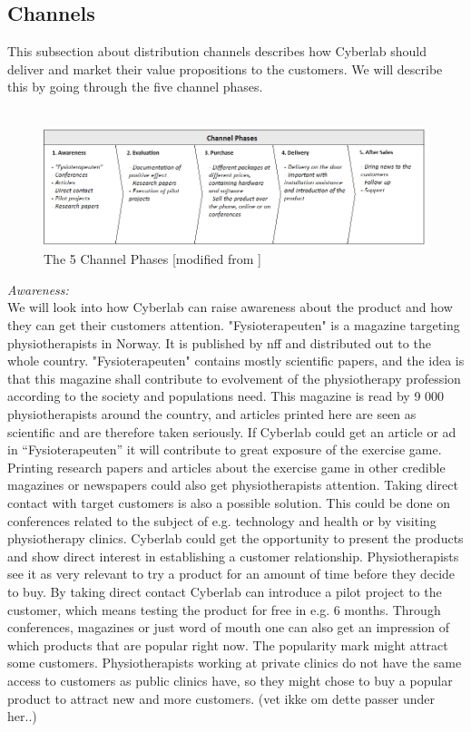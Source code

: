 \subsection{Channels}
This subsection about distribution channels describes how Cyberlab should deliver and market their value propositions to the customers. We will describe this by going through the five channel phases.\\ \\
\begin{figure}
\label{fig:Channels}
\begin{center}
\includegraphics[angle=90,scale=0.7]{channels}
\caption[Channels]{The 5 Channel Phases [modified from \cite{osterwalder}\cite{osterwalderthesis}]}
\end{center}
\end{figure}
\emph{Awareness:} \\ 
We will look into how Cyberlab can raise awareness about the product and how they can get their customers attention.  "Fysioterapeuten" is a magazine targeting physiotherapists in Norway. It is published by \ac{nff} and distributed out to the whole country. "Fysioterapeuten" contains mostly scientific papers, and the idea is that this magazine shall contribute to evolvement of the physiotherapy profession according to the society and populations need. This magazine is read by 9 000 physiotherapists around the country, and articles printed here are seen as scientific and are therefore taken seriously. If Cyberlab could get an article or ad in “Fysioterapeuten” it will contribute to great exposure of the exercise game.  Printing research papers and articles about the exercise game in other credible magazines or newspapers could also get physiotherapists attention.  Taking direct contact with target customers is also a possible solution. This could be done on conferences related to the subject of e.g. technology and health or by visiting physiotherapy clinics. Cyberlab could get the opportunity to present the products and show direct interest in establishing a customer relationship. Physiotherapists see it as very relevant to try a product for an amount of time before they decide to buy. By taking direct contact Cyberlab can introduce a pilot project to the customer, which means testing the product for free in e.g. 6 months. Through conferences, magazines or just word of mouth one can also get an impression of which products that are popular right now. The popularity mark might attract some customers. Physiotherapists working at private clinics do not have the same access to customers as public clinics have, so they might chose to buy a popular product to attract new and more customers. (vet ikke om dette passer under her..)\\ \\ 
